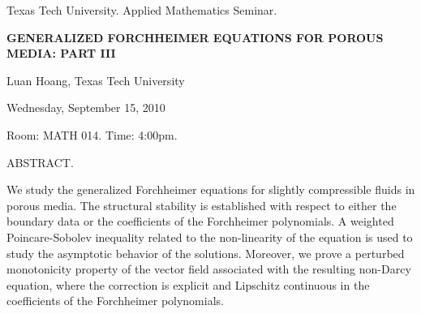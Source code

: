 \documentclass[oneside]{amsart}
\newcommand{\talktitle}{Generalized Forchheimer equations for porous media: Part III}
\newcommand{\talkspeaker}{Luan Hoang, Texas Tech University}
\newcommand{\talkdate}{Wednesday, September 15, 2010}
\newcommand{\talkabstract}{
We study the generalized Forchheimer equations for slightly compressible fluids in porous media.
The structural stability is established with respect to either  the  boundary data or the coefficients of the Forchheimer polynomials. 
A weighted  Poincare-Sobolev inequality related to the non-linearity of the equation is used to study the asymptotic behavior of the solutions. 
Moreover, we prove a perturbed  monotonicity property of the vector field associated with the resulting non-Darcy equation, where the correction is explicit and Lipschitz continuous in the coefficients of the Forchheimer polynomials.
}
\begin{document}
\thispagestyle{empty}

\begin{center}
Texas Tech University.  Applied Mathematics Seminar.

\end{center}

\begin{center}

\textbf{\LARGE {\uppercase{\talktitle}} }

\talkspeaker

\talkdate

Room: MATH 014.  Time: 4:00pm.

\end{center}

ABSTRACT.
\talkabstract
\end{document}
